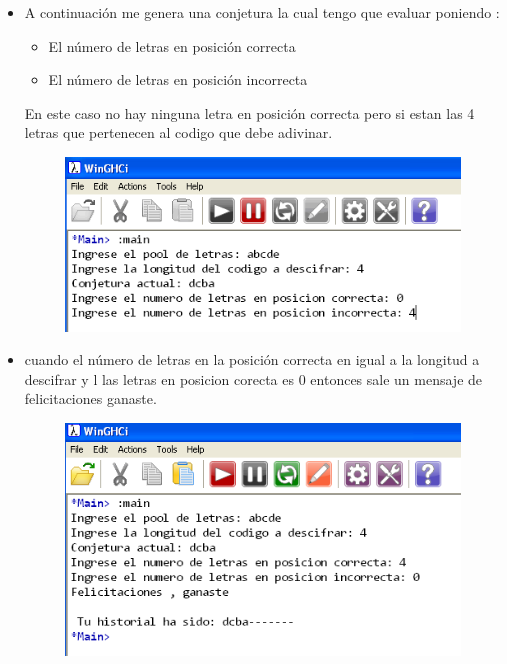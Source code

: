 \begin{itemize}
  \item A continuación me genera una conjetura la cual tengo que evaluar poniendo :
          \begin{itemize}
          \item El número de letras en posición correcta
          \item El número de letras en posición incorrecta
          \end{itemize}
  En este caso no hay ninguna letra en posición correcta pero si estan las 4 letras que pertenecen al codigo que debe adivinar.
 \begin{figure}[htb]
        \centering
        \includegraphics[width=0.99\textwidth]{./imagenes5/img8.png}
        \end{figure}
\item cuando el número de letras en la posición correcta en igual a la longitud a descifrar y l las letras en posicion corecta es 0 entonces sale un mensaje de felicitaciones ganaste.
        \begin{figure}[htb]
        \centering
        \includegraphics[width=0.99\textwidth]{./imagenes5/img9.png}
        \end{figure}

 \end{itemize}

